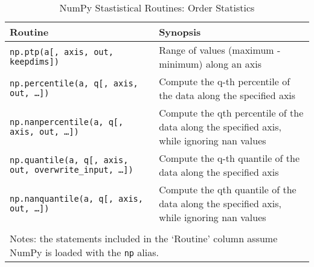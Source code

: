 \documentclass[a4paper,11pt]{book}
\numberwithin{figure}{chapter}
\numberwithin{table}{chapter}
\begin{document}
\begin{sidewaystable}[!htbp]
	\centering
	\caption{NumPy Stastistical Routines: Order Statistics}
	\label{tab:order_stats}
	\begin{tabular}{ll}
		\toprule \toprule
			Routine & Synopsis \\
			\midrule
                        \texttt{np.ptp(a[, axis, out, keepdims])}&
                        Range of values (maximum - minimum) along an axis\\
                        \texttt{np.percentile(a, q[, axis, out, \ldots])}&
                        Compute the q-th percentile of the data along the specified axis\\
                        \texttt{np.nanpercentile(a, q[, axis, out, \ldots])}&
                        Compute the qth percentile of the data along the specified axis, while ignoring nan values\\
                        \texttt{np.quantile(a, q[, axis, out, overwrite\_input, \ldots])}&
                        Compute the q-th quantile of the data along the specified axis\\
                        \texttt{np.nanquantile(a, q[, axis, out, \ldots])}&
                        Compute the qth quantile of the data along the specified axis, while ignoring nan values\\
	     	\bottomrule \\[-1.8ex]
	        \multicolumn{2}{l}{Notes: the statements included in the `Routine' column assume NumPy is loaded with the \texttt{np} alias.} \\
	\end{tabular}
\end{sidewaystable}
\end{document}
